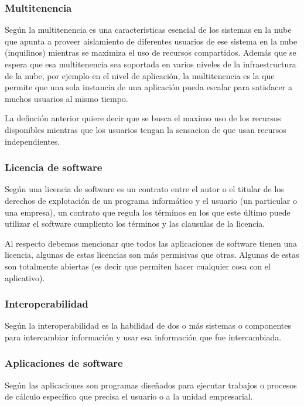 \subsubsection{Multitenencia}

Según \cite{chandra} la multitenencia es una caracteristicas esencial de los
sistemas en la nube que apunta a proveer aislamiento de diferentes usuarios de
ese sistema en la nube (inquilinos) mientras se maximiza el uso de recursos compartidos.
Además \citep{chandra} que se espera que esa multitenencia sea soportada en varios niveles de la infraestructura
de la nube, por ejemplo en el nivel de aplicación, la multitenencia es la que permite
que una sola instancia de una aplicación pueda escalar para satisfacer a muchos
usuarios al mismo tiempo.

La definción anterior quiere decir que se busca el maximo uso de los recursos
disponibles mientras que los usuarios tengan la sensacion de que usan recursos
independientes.
\subsubsection{Licencia de software}
Según \cite{moro} una licencia de software es un contrato entre el autor o el titular
de los derechos de explotación de un programa informático y el usuario (un particular
o una empresa), un contrato que regula los términos en los que este último puede
utilizar el software cumpliento los términos y las clausulas de la licencia.

Al respecto debemos mencionar que todos las aplicaciones de software tienen una
licencia, algunas de estas licencias son más permisivas que otras. Algunas de estas
son totalmente abiertas (es decir que permiten hacer cualquier cosa con el aplicativo).
\subsubsection{Interoperabilidad}
Según \cite{kajan} la interoperabilidad es la habilidad de dos o más sistemas o
componentes para intercambiar información y usar esa información que fue intercambiada.
\subsubsection{Aplicaciones de software}

Según \cite{pablos} las aplicaciones son programas diseñados para ejecutar
trabajos o procesos de cálculo específico que precisa el usuario o a la unidad
empresarial.
